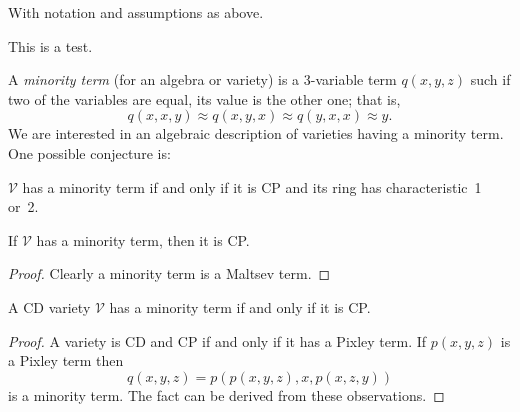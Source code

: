 
























With notation and assumptions as above.

\begin{theorem}
This is a test.
\end{theorem}







%




A \emph{minority term} (for an algebra or variety) is a 
3-variable term $q(x,y,z)$ such if two of the variables
are equal, its value is the other one; that is, 
\[
q(x,x,y) \approx q(x,y,x) \approx q(y,x,x) \approx y.
\]
We are interested in an algebraic description of varieties having
a minority term. One possible conjecture is:
\begin{conjecture}
$\mathcal V$ has a minority term if and only if it is CP and its
ring has characteristic~1 or~2.
\end{conjecture}



\begin{fact}
If $\mathcal V$ has a minority term, then it is CP.
\end{fact}

\begin{proof}
Clearly a minority term is a Maltsev term.
\end{proof}

\begin{fact}
A CD variety $\mathcal V$ has a minority term if and
only if it is CP.
\end{fact}

\begin{proof}
A variety is CD and CP if and only if it has a Pixley term. 
If $p(x,y,z)$ is a Pixley term then 
\[
q(x,y,z) = p(p(x,y,z),x,p(x,z,y))
\]
is a minority term. The fact can be derived from these
observations.
\end{proof}

